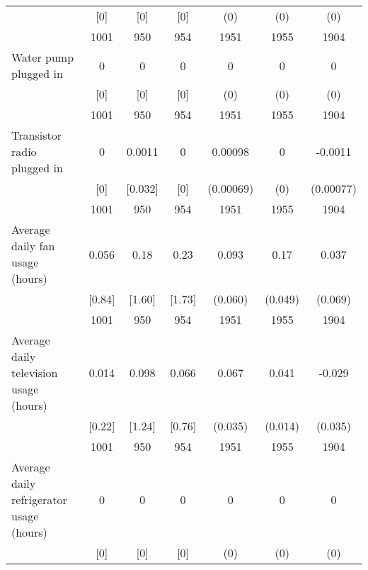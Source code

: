 \begin{table}[htbp]
\begin{tabular*}{1\hsize}{@{\hskip\tabcolsep\extracolsep\fill}l*{1}{cccccc}}
                                &      [0]&      [0]&      [0]&      (0)         &      (0)         &      (0)         \\
                                &     1001&      950&      954&     1951         &     1955         &     1904         \\
Water pump plugged in           &        0&        0&        0&        0         &        0         &        0         \\
                                &      [0]&      [0]&      [0]&      (0)         &      (0)         &      (0)         \\
                                &     1001&      950&      954&     1951         &     1955         &     1904         \\
Transistor radio plugged in     &        0&   0.0011&        0&  0.00098         &        0         &  -0.0011         \\
                                &      [0]&  [0.032]&      [0]&(0.00069)         &      (0)         &(0.00077)         \\
                                &     1001&      950&      954&     1951         &     1955         &     1904         \\
Average daily fan usage (hours) &    0.056&     0.18&     0.23&    0.093         &     0.17\sym{***}&    0.037         \\
                                &   [0.84]&   [1.60]&   [1.73]&  (0.060)         &  (0.049)         &  (0.069)         \\
                                &     1001&      950&      954&     1951         &     1955         &     1904         \\
Average daily television usage (hours)&    0.014&    0.098&    0.066&    0.067\sym{*}  &    0.041\sym{***}&   -0.029         \\
                                &   [0.22]&   [1.24]&   [0.76]&  (0.035)         &  (0.014)         &  (0.035)         \\
                                &     1001&      950&      954&     1951         &     1955         &     1904         \\
Average daily refrigerator usage (hours)&        0&        0&        0&        0         &        0         &        0         \\
                                &      [0]&      [0]&      [0]&      (0)         &      (0)         &      (0)         \\

\end{tabular*}
\end{table}
